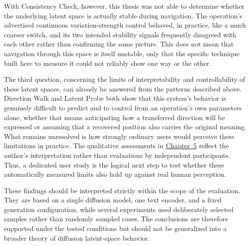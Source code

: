 With Consistency Check, however, this thesis was not able to determine whether the underlying latent space is actually stable during navigation. The operation's advertised continuous variation-strength control behaved, in practice, like a much coarser switch, and its two intended stability signals frequently disagreed with each other rather than confirming the same picture. This does not mean that navigation through this space is itself unstable, only that the specific technique built here to measure it could not reliably show one way or the other.

The third question, concerning the limits of interpretability and controllability of these latent spaces, can already be answered from the patterns described above. Direction Walk and Latent Probe both show that this system's behavior is genuinely difficult to predict and to control from an operation's own parameters alone, whether that means anticipating how a transferred direction will be expressed or assuming that a recovered position also carries the original meaning. What remains unresolved is how strongly ordinary users would perceive these limitations in practice. The qualitative assessments in \hyperref[ch:results]{Chapter~5} reflect the author's interpretation rather than evaluations by independent participants. Thus, a dedicated user study is the logical next step to test whether these automatically measured limits also hold up against real human perception.

These findings should be interpreted strictly within the scope of the evaluation. They are based on a single diffusion model, one text encoder, and a fixed generation configuration, while several experiments used deliberately selected samples rather than randomly sampled cases. The conclusions are therefore supported under the tested conditions but should not be generalized into a broader theory of diffusion latent-space behavior.
